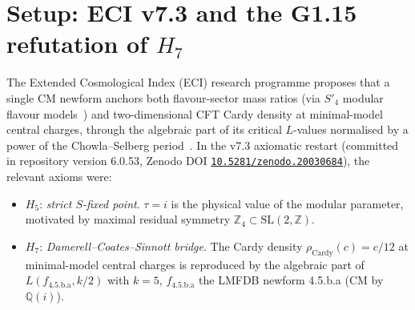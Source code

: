\documentclass[a4paper,11pt]{article}
\newcommand{\Spf}{S'_4}
\newcommand{\fLM}{f_{\text{4.5.b.a}}}
\newcommand{\Qi}{\mathbb{Q}(i)}
\newcommand{\Zeno}{\href{https://doi.org/10.5281/zenodo.20030684}{\texttt{10.5281/zenodo.20030684}}}
\theoremstyle{definition}
\theoremstyle{remark}
\begin{document}
\begin{abstract}
\cite{DKLL19,LMS22}) yields a 2-parameter neutrino sector with NO,
$m_1=0$, $\delta_{CP}\approx -87^{\circ}$ -- testable by DUNE 2030+ at
$\pm 15^{\circ}$.  However, this prediction does \emph{not} survive
the W1 single-$\tau$ refit: Section~\ref{sec:caveat} reports a hard
$24.5\sigma$ pull on $\sin^2\theta_{13}$ that pushes the v7.4 picture
toward a two-tau ($\tau_q\ne\tau_l$) reformulation.  Section~\ref{sec:G112B}
records the G1.12.B campaign progress (M1+M2 PASS; M3-M6 forecast
3.5-5 month) which targets a parameter-free $B(p\to e^+\pi^0)/
B(p\to K^+\bar\nu)\in[0.3,3]$ Hyper-K/DUNE 2030+ falsifier.
We discuss falsifiers (Tonks--Girardeau density, modular flavour
lepton sector, NMC cosmological NULL at Cassini) and flag two
open questions: the failure to cleanly fit $c=7/10$ (tricritical
Ising) and $c=4/5$ (tetracritical Potts) under either bridge route,
and the open $\sqrt 6$ structure.
\end{abstract}

\section{Setup: ECI v7.3 and the G1.15 refutation of $H_7$}
\label{sec:setup}

The Extended Cosmological Index (ECI) research programme proposes that
a single CM newform anchors both flavour-sector mass ratios (via
$\Spf$ modular flavour models~\cite{NPP20,LYD20,dMVP26}) and
two-dimensional CFT Cardy density at minimal-model central charges,
through the algebraic part of its critical $L$-values normalised by a
power of the Chowla--Selberg period~\cite{ChowSel49}.  In the v7.3
axiomatic restart (committed in repository version 6.0.53, Zenodo DOI
\Zeno), the relevant axioms were:
\begin{itemize}
  \item $H_5$: \emph{strict $S$-fixed point}.  $\tau = i$ is the
    physical value of the modular parameter, motivated by maximal
    residual symmetry $\mathbb{Z}_4\subset\mathrm{SL}(2,\mathbb{Z})$.
  \item $H_7$: \emph{Damerell--Coates--Sinnott bridge}.  The Cardy
    density $\rho_{\mathrm{Cardy}}(c)=c/12$ at minimal-model central
    charges is reproduced by the algebraic part of $L(\fLM, k/2)$ with
    $k=5$, $\fLM$ the LMFDB newform 4.5.b.a (CM by $\Qi$).
\end{itemize}
\end{document}
